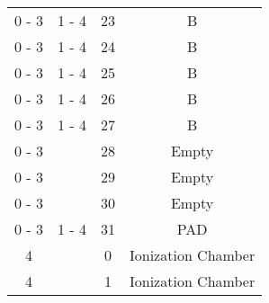 \begin{tabular}{cccc}
0 - 3  &  1 - 4   &  23     &  B                    		   					\\
0 - 3  &  1 - 4   &  24     &  B                    		   					\\
0 - 3  &  1 - 4   &  25     &  B                    		   					\\
0 - 3  &  1 - 4   &  26     &  B                    		   					\\
0 - 3  &  1 - 4   &  27     &  B                    		   					\\
0 - 3  &          &  28     &  Empty                		   					\\
0 - 3  &          &  29     &  Empty                		   					\\
0 - 3  &          &  30     &  Empty                		   					\\
0 - 3  &  1 - 4   &  31     &  PAD                  		   					\\
  4    &          &  0      &  Ionization Chamber   		   					\\
  4    &          &  1      &  Ionization Chamber   		   					\\
\hline
\end{tabular}
